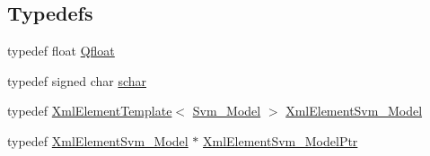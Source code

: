 \subsection*{Typedefs}
\begin{DoxyCompactItemize}
\item 
typedef float \hyperlink{namespace_s_v_m289___m_f_s_a440663a1b8d42bc10329401883645ae1}{Qfloat}
\item 
typedef signed char \hyperlink{namespace_s_v_m289___m_f_s_a27545e8471784d831870feacd3e831ff}{schar}
\item 
typedef \hyperlink{class_k_k_b_1_1_xml_element_template}{Xml\+Element\+Template}$<$ \hyperlink{struct_s_v_m289___m_f_s_1_1_svm___model}{Svm\+\_\+\+Model} $>$ \hyperlink{namespace_s_v_m289___m_f_s_a4d0f861b3add61d2800b4dfbc4150186}{Xml\+Element\+Svm\+\_\+\+Model}
\item 
typedef \hyperlink{namespace_s_v_m289___m_f_s_a4d0f861b3add61d2800b4dfbc4150186}{Xml\+Element\+Svm\+\_\+\+Model} $\ast$ \hyperlink{namespace_s_v_m289___m_f_s_ae91ce5ddb69b689aabd2a9b356603b49}{Xml\+Element\+Svm\+\_\+\+Model\+Ptr}
\end{DoxyCompactItemize}
